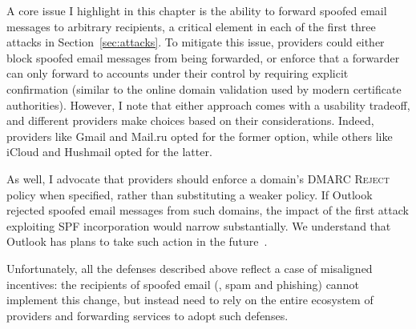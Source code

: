 A core issue I highlight in this chapter is the ability to forward spoofed email messages to arbitrary recipients, a critical element in each
of the first three attacks in Section~\ref{sec:attacks}. To mitigate this issue, providers could either block spoofed email messages from being forwarded, or enforce that a forwarder can only forward to accounts under their control by requiring explicit confirmation (similar to
the online domain validation used by modern certificate authorities). However, I note that either approach comes with a usability tradeoff, and different providers make choices based on their considerations. Indeed, providers like Gmail and Mail.ru opted for the former option, while others like iCloud and Hushmail opted for the latter.







As well, I advocate that providers
should enforce a domain's DMARC \textsc{Reject} policy when specified, rather
than substituting a weaker policy.  If Outlook rejected spoofed
email messages from such domains, the impact of the first attack
exploiting SPF incorporation
would
narrow substantially. We understand that Outlook has plans to take such action in the future~\cite{hotmailreject}.


Unfortunately, all the defenses described above reflect a
case of misaligned
incentives: the recipients of spoofed email (\eg, spam and phishing)
cannot implement this change, but instead need to rely on the entire
ecosystem of providers and forwarding services to adopt such defenses. 

